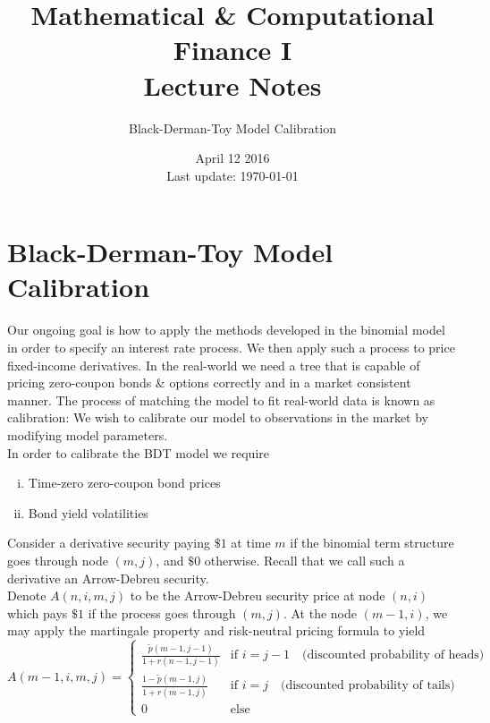 \documentclass[12pt]{article}
\newlength\tindent
\renewcommand{\indent}{\hspace*{\tindent}}
\begin{document}
 
 
\title{Mathematical \& Computational Finance I\\Lecture Notes}
\author{Black-Derman-Toy Model Calibration}
\date{April 12 2016 \\ Last update: \today{}}
\maketitle

\section{Black-Derman-Toy Model Calibration}

\indent Our ongoing goal is how to apply the methods developed in the binomial model in order to specify an interest rate process. We then apply such a process to price fixed-income derivatives. In the real-world we need a tree that is capable of pricing zero-coupon bonds \& options correctly and in a market consistent manner. The process of matching the model to fit real-world data is known as calibration: We wish to calibrate our model to observations in the market by modifying model parameters. \\

In order to calibrate the BDT model we require
\begin{enumerate}[(i)]
	\item Time-zero zero-coupon bond prices
	\item Bond yield volatilities
\end{enumerate}

\indent Consider a derivative security paying $\$1$ at time $m$ if the binomial term structure goes through node $(m,j)$, and $\$0$ otherwise. Recall that we call such a derivative an Arrow-Debreu security. \\

\indent Denote $A(n,i,m,j)$ to be the Arrow-Debreu security price at node $(n,i)$ which pays $\$1$ if the process goes through $(m,j)$. At the node $(m - 1, i)$, we may apply the martingale property and risk-neutral pricing formula to yield
\begin{equation*}
	A(m - 1, i, m, j) =
	\begin{cases}
		\frac{ \tilde{p}(m - 1, j - 1) }{ 1 + r(n - 1, j - 1) } & \text{if } i = j - 1 \quad \text{(discounted probability of heads)} \\
		\frac{1 - \tilde{p}(m - 1, j) }{ 1 + r(m - 1, j) } & \text{if } i = j \quad \text{(discounted probability of tails)} \\
		0 & \text{else}
	\end{cases}
\end{equation*}
\end{document}
